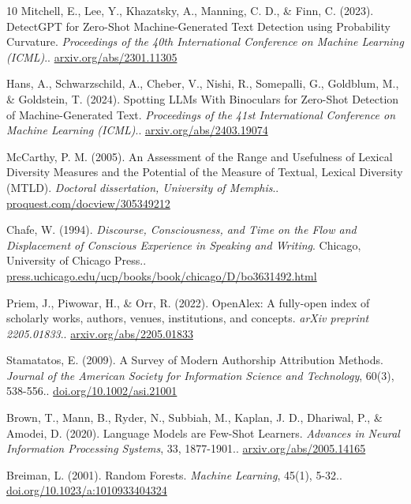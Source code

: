 \documentclass{article}
\begin{document}
\begin{thebibliography}{10}
Mitchell, E., Lee, Y., Khazatsky, A., Manning, C. D., \& Finn, C. (2023). DetectGPT for Zero-Shot Machine-Generated Text Detection using Probability Curvature. \textit{Proceedings of the 40th International Conference on Machine Learning (ICML)}.. \href{https://arxiv.org/abs/2301.11305}{arxiv.org/abs/2301.11305}

Hans, A., Schwarzschild, A., Cheber, V., Nishi, R., Somepalli, G., Goldblum, M., \& Goldstein, T. (2024). Spotting LLMs With Binoculars for Zero-Shot Detection of Machine-Generated Text. \textit{Proceedings of the 41st International Conference on Machine Learning (ICML)}.. \href{https://arxiv.org/abs/2403.19074}{arxiv.org/abs/2403.19074}

McCarthy, P. M. (2005). An Assessment of the Range and Usefulness of Lexical Diversity Measures and the Potential of the Measure of Textual, Lexical Diversity (MTLD). \textit{Doctoral dissertation, University of Memphis}.. \href{https://www.proquest.com/docview/305349212}{proquest.com/docview/305349212}

Chafe, W. (1994). \textit{Discourse, Consciousness, and Time on the Flow and Displacement of Conscious Experience in Speaking and Writing}. Chicago, University of Chicago Press.. \href{https://press.uchicago.edu/ucp/books/book/chicago/D/bo3631492.html}{press.uchicago.edu/ucp/books/book/chicago/D/bo3631492.html}

Priem, J., Piwowar, H., \& Orr, R. (2022). OpenAlex: A fully-open index of scholarly works, authors, venues, institutions, and concepts. \textit{arXiv preprint 2205.01833}.. \href{https://arxiv.org/abs/2205.01833}{arxiv.org/abs/2205.01833}

Stamatatos, E. (2009). A Survey of Modern Authorship Attribution Methods. \textit{Journal of the American Society for Information Science and Technology}, 60(3), 538-556.. \href{https://doi.org/10.1002/asi.21001}{doi.org/10.1002/asi.21001}

Brown, T., Mann, B., Ryder, N., Subbiah, M., Kaplan, J. D., Dhariwal, P., \& Amodei, D. (2020). Language Models are Few-Shot Learners. \textit{Advances in Neural Information Processing Systems}, 33, 1877-1901.. \href{https://arxiv.org/abs/2005.14165}{arxiv.org/abs/2005.14165}

Breiman, L. (2001). Random Forests. \textit{Machine Learning}, 45(1), 5-32.. \href{https://doi.org/10.1023/a:1010933404324}{doi.org/10.1023/a:1010933404324}


\end{thebibliography}
\end{document}
